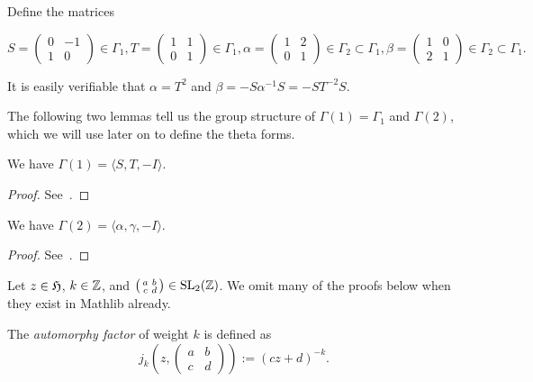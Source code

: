 \begin{definition}\label{def:Gamma-generators}\leanok
  Define the matrices

  \[
    S = \begin{pmatrix} 0 & -1 \\ 1 & 0 \end{pmatrix} \in \Gamma_1,
    T = \begin{pmatrix} 1 & 1 \\ 0 & 1 \end{pmatrix} \in \Gamma_1,
    \alpha = \begin{pmatrix} 1 & 2 \\ 0 & 1 \end{pmatrix} \in \Gamma_2 \subset \Gamma_1,
    \beta = \begin{pmatrix} 1 & 0 \\ 2 & 1 \end{pmatrix} \in \Gamma_2 \subset \Gamma_1.
  \]

  It is easily verifiable that $\alpha = T^2$ and $\beta = -S\alpha^{-1}S = -ST^{-2}S$.
\end{definition}

The following two lemmas tell us the group structure of $\Gamma(1) = \Gamma_1$ and $\Gamma(2)$, which we will use later on to define the theta forms.

\begin{lemma}\label{lemma:Gamma-1-generators}
  We have $\Gamma(1) = \langle S, T, -I \rangle$.
\end{lemma}
\begin{proof}
  See~\cite[Exercise 1.1.1]{first course}.
\end{proof}

\begin{lemma}\label{lemma:Gamma-2-generators}
  We have $\Gamma(2) = \langle \alpha, \gamma, -I \rangle$.
\end{lemma}
\begin{proof}
  See~\cite[Exercise 1.2.4]{first course}.
\end{proof}

Let $z\in\mathfrak{H}$, $k\in\mathbb{Z}$, and $\left(\begin{smallmatrix}a&b\\c&d\end{smallmatrix}\right)\in\mathrm{SL}_2(\mathbb{Z})$. We omit many of the proofs below when they exist in Mathlib already.
\begin{definition}\label{def:automorphy-factor}
    The \emph{automorphy factor} of weight $k$ is defined as
$$j_k(z,\left(\begin{smallmatrix}a&b\\c&d\end{smallmatrix}\right)):=(cz+d)^{-k}.$$
\end{definition}

